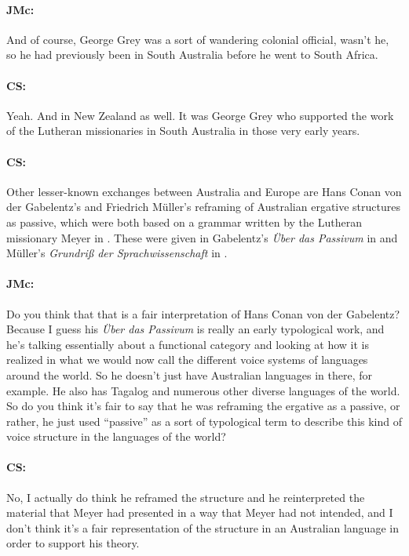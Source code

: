 \documentclass[output=paper]{langscibook}
\begin{document}
\paragraph*{JMc:}  And of course, George Grey was a sort of wandering colonial official, wasn’t he, so he had previously been in South Australia before he went to South Africa.


\paragraph*{CS:}  Yeah. And in New Zealand as well. It was George Grey who supported the work of the Lutheran missionaries in South Australia in those very early years.


\paragraph*{CS:}  Other lesser-known exchanges between Australia and Europe are Hans Conan von der Gabelentz’s and Friedrich Müller’s reframing of Australian ergative structures as passive, which were both based on a grammar written by the Lutheran missionary Meyer in \citeyear{meyer1843a}. These were given in Gabelentz’s \textit{Über das Passivum} in \citeyear{gabelentz1861a} and Müller’s \textit{Grundriß der Sprachwissenschaft} in \citeyear{mueller1882a}.


\paragraph*{JMc:}  Do you think that that is a fair interpretation of Hans Conan von der Gabelentz? Because I guess his \textit{Über das Passivum} is really an early typological work, and he’s talking essentially about a functional category and looking at how it is realized in what we would now call the different voice systems of languages around the world. So he doesn’t just have Australian languages in there, for example. He also has Tagalog and numerous other diverse languages of the world. So do you think it’s fair to say that he was reframing the ergative as a passive, or rather, he just used “passive” as a sort of typological term to describe this kind of voice structure in the languages of the world?


\paragraph*{CS:}  No, I actually do think he reframed the structure and he reinterpreted the material that Meyer had presented in a way that Meyer had not intended, and I don’t think it’s a fair representation of the structure in an Australian language in order to support his theory.
\end{document}
